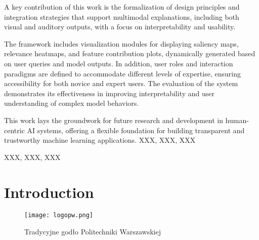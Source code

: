 \documentclass[
    bindingoffset=5mm,  %
    footnoteindent=3mm, %
    hyphenation=true    %
]{src/wut-thesis}
\begin{document}
A key contribution of this work is the formalization of design principles and integration strategies that support multimodal explanations, including both visual and auditory outputs, with a focus on interpretability and usability.

The framework includes visualization modules for displaying saliency maps, relevance heatmaps, and feature contribution plots, dynamically generated based on user queries and model outputs. In addition, user roles and interaction paradigms are defined to accommodate different levels of expertise, ensuring accessibility for both novice and expert users. The evaluation of the system demonstrates its effectiveness in improving interpretability and user understanding of complex model behaviors.

This work lays the groundwork for future research and development in human-centric AI systems, offering a flexible foundation for building transparent and trustworthy machine learning applications.
\keywords XXX, XXX, XXX

\clearpage
\secondabstract \kant[1-3]
\secondkeywords XXX, XXX, XXX

\pagestyle{plain}

\cleardoublepage %
\tableofcontents

\cleardoublepage %
\pagestyle{headings}

%
%
\clearpage %
\section{Introduction} \label{ch:introduction}

\lipsum[1] \cite{goossens93}

\begin{figure}%
    \centering \texttt{[image: logopw.png]}
    \caption{Tradycyjne godło Politechniki Warszawskiej}
    \label{fig:tradycyjne-logo-pw}
\end{figure}
\end{document}
